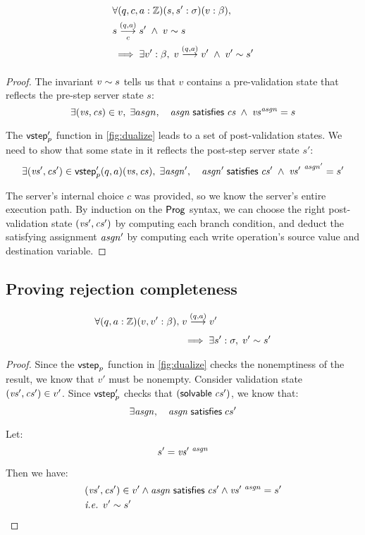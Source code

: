 \begin{lemma}[\ref{eq:rs2}]
  \begin{align*}
    &\forall(q,c,a:\Int)(s,s':\sigma)(v:\beta),\\
    &\triggers sc{(q,a)}s'\;\wedge\;\Reflects{v}{s}\\
    &\implies\exists v':\beta,\;\behaves v{(q,a)}v'\;\wedge\;\Reflects{v'}{s'}
  \end{align*}
\begin{proof}
The invariant $v\sim s$ tells us that $v$ contains a pre-validation
state that reflects the pre-step server state $s$:
\[\exists(\mathit{vs},\mathit{cs})\in v,\;\exists asgn,\quad\mathit{asgn}\;\mathsf{satisfies}\;\mathit{cs}\;\wedge\;{\mathit{vs}}^{\mathit{asgn}}=s\]

The $\mathsf{vstep}'_p$ function in \autoref{fig:dualize} leads to a set of
post-validation states.  We need to show that some state in it reflects the
post-step server state $s'$:
\[\exists(\mathit{vs}',\mathit{cs}')\in\mathsf{vstep}_p'(q,a)(\mathit{vs},\mathit{cs}),\;\exists\mathit{asgn}',\quad\mathit{asgn}'\;\mathsf{satisfies}\;\mathit{cs}'\;\wedge\;{\mathit{vs}'}^{~\mathit{asgn}'}=s'\]

The server's internal choice $c$ was provided, so we know the server's entire
execution path.  By induction on the $\mathsf{Prog}$ syntax, we can choose the right
post-validation state $(\mathit{vs}',\mathit{cs}')$ by computing each branch condition, and
deduct the satisfying assignment $\mathit{asgn}'$ by computing each write operation's
source value and destination variable.
\end{proof}
\end{lemma}

\subsection{Proving rejection completeness}
\label{sec:proof-complete}

\begin{lemma}[\ref{eq:rc1}]
\begin{align*}
\forall(q,a:\Int)(v,v':\beta),\;&\behaves v{(q,a)}v'\\
&\implies\exists s':\sigma,\;\Reflects{v'}{s'}
\end{align*}
\begin{proof}
Since the $\mathsf{vstep}_p$ function in \autoref{fig:dualize} checks the nonemptiness
of the result, we know that $v'$ must be nonempty.  Consider validation state
$(\mathit{vs}',\mathit{cs}')\in v'$.  Since $\mathsf{vstep}'_p$ checks that $(\mathsf{solvable}\; \mathit{cs}')$, we know
that:
\[\exists \mathit{asgn},\quad\mathit{asgn}\;\mathsf{satisfies}\;cs'\]

Let:
\[s'=\mathit{vs}'^{~\mathit{asgn}}\]

Then we have:
\begin{align*}
&(\mathit{vs}',\mathit{cs}')\in v'\wedge \mathit{asgn}\;\mathsf{satisfies}\;\mathit{cs}'\wedge \mathit{vs}'^{~\mathit{asgn}}=s'\\
&\textit{i.e. }v'\sim s'\tag*{\qedhere}
\end{align*}
\end{proof}
\end{lemma}

